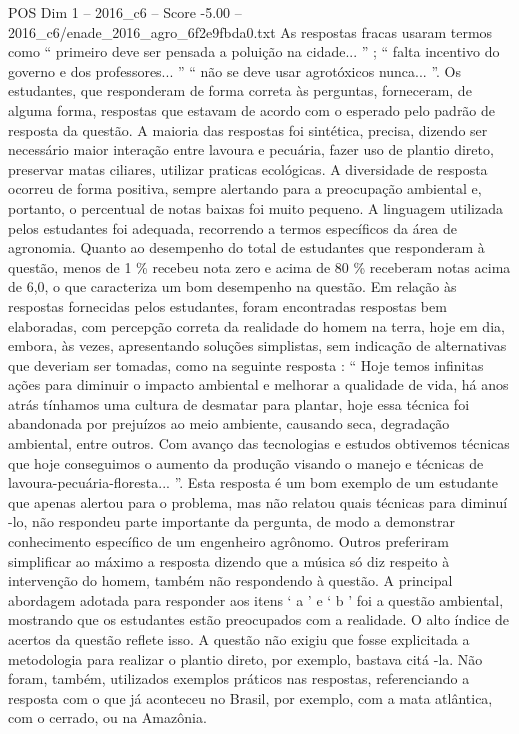\begin{textsample}{POS Dim 1 – 2016\_c6 – Score -5.00 – 2016\_c6/enade\_2016\_agro\_6f2e9fbda0.txt}
As respostas fracas usaram termos como “ primeiro deve ser pensada a poluição na cidade... ” ; “ falta incentivo do governo e dos professores... ” “ não se deve usar agrotóxicos nunca... ”.
Os estudantes, que responderam de forma correta às perguntas, forneceram, de alguma forma, respostas que estavam de acordo com o esperado pelo padrão de resposta da questão.
A maioria das respostas foi sintética, precisa, dizendo ser necessário maior interação entre lavoura e pecuária, fazer uso de plantio direto, preservar matas ciliares, utilizar praticas ecológicas.
A diversidade de resposta ocorreu de forma positiva, sempre alertando para a preocupação ambiental e, portanto, o percentual de notas baixas foi muito pequeno.
A linguagem utilizada pelos estudantes foi adequada, recorrendo a termos específicos da área de agronomia.
Quanto ao desempenho do total de estudantes que responderam à questão, menos de 1 \% recebeu nota zero e acima de 80 \% receberam notas acima de 6,0, o que caracteriza um bom desempenho na questão.
Em relação às respostas fornecidas pelos estudantes, foram encontradas respostas bem elaboradas, com percepção correta da realidade do homem na terra, hoje em dia, embora, às vezes, apresentando soluções simplistas, sem indicação de alternativas que deveriam ser tomadas, como na seguinte resposta : “ Hoje temos infinitas ações para diminuir o impacto ambiental e melhorar a qualidade de vida, há anos atrás tínhamos uma cultura de desmatar para plantar, hoje essa técnica foi abandonada por prejuízos ao meio ambiente, causando seca, degradação ambiental, entre outros.
Com avanço das tecnologias e estudos obtivemos técnicas que hoje conseguimos o aumento da produção visando o manejo e técnicas de lavoura-pecuária-floresta... ”.
Esta resposta é um bom exemplo de um estudante que apenas alertou para o problema, mas não relatou quais técnicas para diminuí -lo, não respondeu parte importante da pergunta, de modo a demonstrar conhecimento específico de um engenheiro agrônomo.
Outros preferiram simplificar ao máximo a resposta dizendo que a música só diz respeito à intervenção do homem, também não respondendo à questão.
A principal abordagem adotada para responder aos itens ‘ a ’ e ‘ b ’ foi a questão ambiental, mostrando que os estudantes estão preocupados com a realidade.
O alto índice de acertos da questão reflete isso.
A questão não exigiu que fosse explicitada a metodologia para realizar o plantio direto, por exemplo, bastava citá -la.
Não foram, também, utilizados exemplos práticos nas respostas, referenciando a resposta com o que já aconteceu no Brasil, por exemplo, com a mata atlântica, com o cerrado, ou na Amazônia.

\end{textsample}
